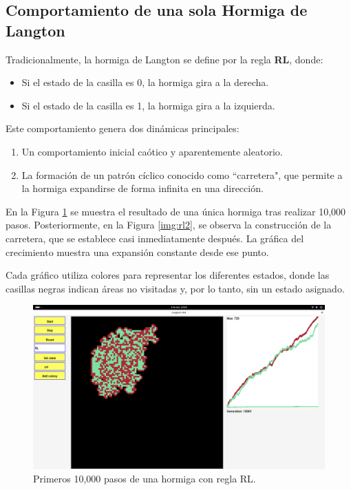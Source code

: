 \documentclass[12pt,twoside]{article}
\begin{document}
\subsection{Comportamiento de una sola Hormiga de Langton}

Tradicionalmente, la hormiga de Langton se define por la regla \textbf{RL}, donde:  
\begin{itemize}
	\item Si el estado de la casilla es 0, la hormiga gira a la derecha.  
	\item Si el estado de la casilla es 1, la hormiga gira a la izquierda.  
\end{itemize}

Este comportamiento genera dos dinámicas principales:  
\begin{enumerate}
	\item Un comportamiento inicial caótico y aparentemente aleatorio.  
	\item La formación de un patrón cíclico conocido como ``carretera", que permite a la hormiga expandirse de forma infinita en una dirección.  
\end{enumerate}

En la Figura \ref{img:rl1} se muestra el resultado de una única hormiga tras realizar 10,000 pasos. Posteriormente, en la Figura \ref{img:rl2}, se observa la construcción de la carretera, que se establece casi inmediatamente después. La gráfica del crecimiento muestra una expansión constante desde ese punto.

Cada gráfico utiliza colores para representar los diferentes estados, donde las casillas negras indican áreas no visitadas y, por lo tanto, sin un estado asignado.

\begin{figure}[H]
	\centering
	\includegraphics[width=\textwidth]{img/rl1.png}
	\caption{Primeros 10,000 pasos de una hormiga con regla RL.}
	\label{img:rl1}
\end{figure}
\end{document}
